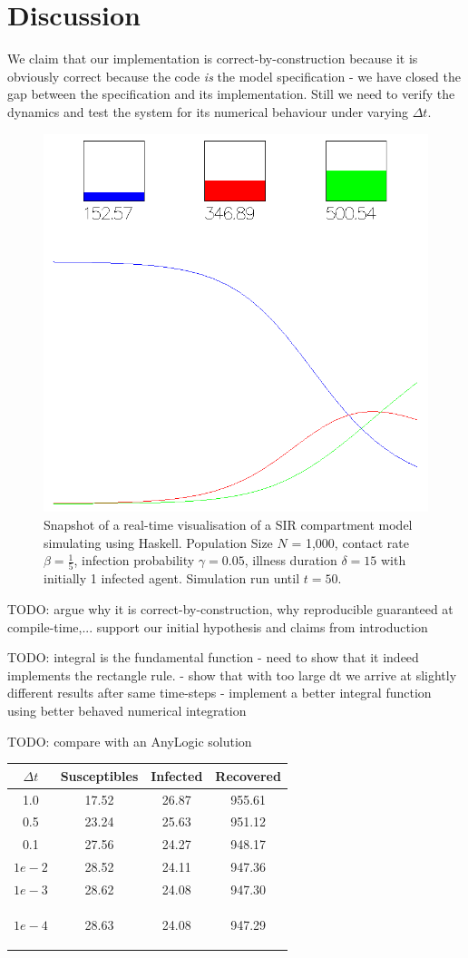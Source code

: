 \section{Discussion}
We claim that our implementation is correct-by-construction because it is obviously correct because the code \textit{is} the model specification - we have closed the gap between the specification and its implementation. Still we need to verify the dynamics and test the system for its numerical behaviour under varying $\Delta t$.

\begin{figure}
	\centering
	\includegraphics[width=.4\textwidth, angle=0]{./fig/visualisation_t50.png}
	\caption{Snapshot of a real-time visualisation of a SIR compartment model simulating using Haskell. Population Size $N$ = 1,000, contact rate $\beta =  \frac{1}{5}$, infection probability $\gamma = 0.05$, illness duration $\delta = 15$ with initially 1 infected agent. Simulation run until $t = 50$.}
	\label{fig:sir_sd_visualisation}
\end{figure}

TODO: argue why it is correct-by-construction, why reproducible guaranteed at compile-time,... support our initial hypothesis and claims from introduction

TODO: integral is the fundamental function
- need to show that it indeed implements the rectangle rule. 
- show that with too large dt we arrive at slightly different results after same time-steps
- implement a better integral function using better behaved numerical integration

TODO: compare with an AnyLogic solution

\begin{center}
  \begin{tabular}{ c || c | c | c  }
    $\Delta t$ & Susceptibles & Infected & Recovered \\ \hline \hline 
    1.0 & 17.52 & 26.87 & 955.61 \\ \hline
    0.5 & 23.24 & 25.63 & 951.12 \\ \hline
    0.1 & 27.56 & 24.27 & 948.17 \\ \hline
    $1e-2$ & 28.52 & 24.11 & 947.36 \\ \hline
    $1e-3$ & 28.62 & 24.08 & 947.30 \\ \hline
    $1e-4$ & 28.63 & 24.08 & 947.29
    
    \label{tab:delta_influence}
  \end{tabular}
\end{center}